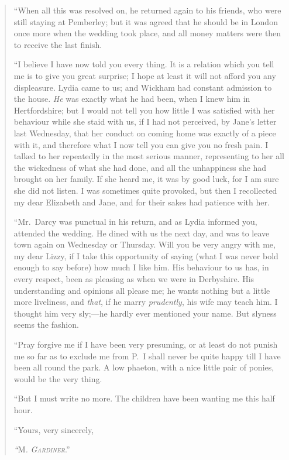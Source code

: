 \documentclass[12pt,english]{book}
\newcommand{\noun}[1]{\textsc{#1}}
\begin{document}
\begin{quotation}
{}``When all this was resolved on, he returned again to his friends,
who were still staying at Pemberley; but it was agreed that he should
be in London once more when the wedding took place, and all money
matters were then to receive the last finish.

{}``I believe I have now told you every thing. It is a relation which
you tell me is to give you great surprise; I hope at least it will
not afford you any displeasure. Lydia came to us; and Wickham had
constant admission to the house. \textit{He} was exactly what he had
been, when I knew him in Hertfordshire; but I would not tell you how
little I was satisfied with her behaviour while she staid with us,
if I had not perceived, by Jane's letter last Wednesday, that her
conduct on coming home was exactly of a piece with it, and therefore
what I now tell you can give you no fresh pain. I talked to her repeatedly
in the most serious manner, representing to her all the wickedness
of what she had done, and all the unhappiness she had brought on her
family. If she heard me, it was by good luck, for I am sure she did
not listen. I was sometimes quite provoked, but then I recollected
my dear Elizabeth and Jane, and for their sakes had patience with
her.

{}``Mr.\ Darcy was punctual in his return, and as Lydia informed
you, attended the wedding. He dined with us the next day, and was
to leave town again on Wednesday or Thursday. Will you be very angry
with me, my dear Lizzy, if I take this opportunity of saying (what
I was never bold enough to say before) how much I like him. His behaviour
to us has, in every respect, been as pleasing as when we were in Derbyshire.
His understanding and opinions all please me; he wants nothing but
a little more liveliness, and \textit{that}, if he marry \textit{prudently},
his wife may teach him. I thought him very sly;\mbox{---}he hardly
ever mentioned your name. But slyness seems the fashion.

{}``Pray forgive me if I have been very presuming, or at least do
not punish me so far as to exclude me from P.\  I shall never be
quite happy till I have been all round the park. A low phaeton, with
a nice little pair of ponies, would be the very thing.

{}``But I must write no more. The children have been wanting me this
half hour.

{}``Yours, very sincerely,

\emph{{}``}\noun{M}\emph{\noun{.}} \textit{\emph{\noun{Gardiner}}}.'' 
\end{quotation}
\end{document}
